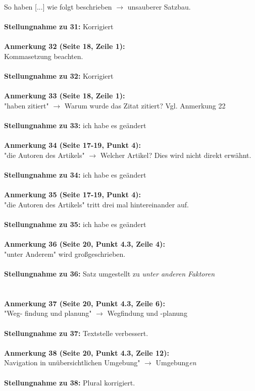 \documentclass[a4paper,12pt]{book}
\begin{document}
So haben [...] wie folgt beschrieben $\rightarrow$ unsauberer Satzbau. \\ \\
\textbf{Stellungnahme zu 31:} Korrigiert
\\ \\
\noindent
\textbf{Anmerkung 32 (Seite 18, Zeile 1):}\\
Kommasetzung beachten. \\ \\
\textbf{Stellungnahme zu 32:} Korrigiert
\\ \\
\noindent
\textbf{Anmerkung 33 (Seite 18, Zeile 1):}\\
"haben zitiert" $\rightarrow$ Warum wurde das Zitat zitiert? Vgl. Anmerkung 22 \\ \\
\textbf{Stellungnahme zu 33:} ich habe es geändert
\\ \\
\noindent
\textbf{Anmerkung 34 (Seite 17-19, Punkt 4):}\\
"die Autoren des Artikels" $\rightarrow$ Welcher Artikel? Dies wird nicht direkt erwähnt. \\ \\
\textbf{Stellungnahme zu 34:} ich habe es geändert
\\ \\
\noindent
\textbf{Anmerkung 35 (Seite 17-19, Punkt 4):}\\
"die Autoren des Artikels" tritt drei mal hintereinander auf. \\ \\
\textbf{Stellungnahme zu 35:} ich habe es geändert
\\ \\
\noindent
\textbf{Anmerkung 36 (Seite 20, Punkt 4.3, Zeile 4):}\\
"unter Anderem" wird großgeschrieben.
\\ \\
\textbf{Stellungnahme zu 36:}
Satz umgestellt zu \emph{unter anderen Faktoren}\\
\\ \\
\noindent
\textbf{Anmerkung 37 (Seite 20, Punkt 4.3, Zeile 6):}\\
"Weg- findung und planung" $\rightarrow$ Wegfindung und -planung 
\\ \\
\textbf{Stellungnahme zu 37:}
Textstelle verbessert.
\\ \\
\noindent
\textbf{Anmerkung 38 (Seite 20, Punkt 4.3, Zeile 12):}\\
Navigation in unübersichtlichen Umgebung" $\rightarrow$ Umgebung\emph{en} \\
\\
\textbf{Stellungnahme zu 38:}
Plural korrigiert.
\\
\end{document}
